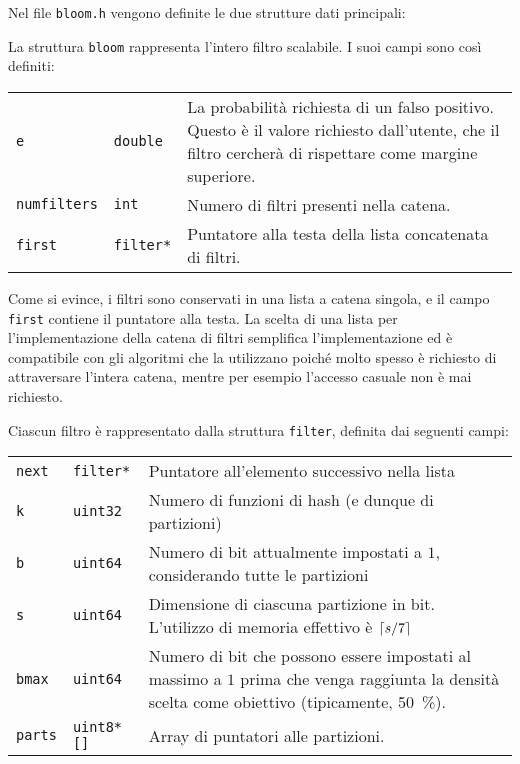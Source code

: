 Nel file \verb|bloom.h| vengono definite le due strutture dati principali:



La struttura \verb|bloom| rappresenta l'intero filtro scalabile. I suoi campi sono
così definiti:

\medskip
\begin{tabular}{ |l|l|p{280pt}| }
  \hline
  \verb|e| & \verb|double| & La probabilità richiesta di un falso positivo. Questo è il valore richiesto
  dall'utente, che il filtro cercherà di rispettare come margine superiore. \\

  \verb|numfilters| & \verb|int| & Numero di filtri presenti nella catena. \\

  \verb|first| & \verb|filter*| & Puntatore alla testa della lista concatenata di filtri. \\
  \hline
\end{tabular}
\medskip

Come si evince, i filtri sono conservati in una lista a catena singola, e il campo \verb|first|
contiene il puntatore alla testa. La scelta di una lista per l'implementazione della catena di
filtri semplifica l'implementazione ed è compatibile con gli algoritmi che la utilizzano poiché
molto spesso è richiesto di attraversare l'intera catena, mentre per esempio l'accesso casuale non è
mai richiesto.

Ciascun filtro è rappresentato dalla struttura \verb|filter|, definita dai seguenti campi:

\medskip
\begin{tabular}{ |l|l|p{280pt}| }
  \hline

  \verb|next| & \verb|filter*| & Puntatore all'elemento successivo nella lista \\

  \verb|k| & \verb|uint32| & Numero di funzioni di hash (e dunque di partizioni) \\

  \verb|b| & \verb|uint64| & Numero di bit attualmente impostati a $1$, considerando tutte le partizioni \\

  \verb|s| & \verb|uint64| & Dimensione di ciascuna partizione in bit. L'utilizzo di memoria
  effettivo è $\lceil s/7\rceil$ \\

  \verb|bmax| & \verb|uint64| & Numero di bit che possono essere impostati al massimo a $1$ prima
  che venga raggiunta la densità scelta come obiettivo (tipicamente, \SI{50}{\percent}). \\

  \verb|parts| & \verb|uint8*[]| & Array di puntatori alle partizioni. \\

  \hline
\end{tabular}
\medskip

